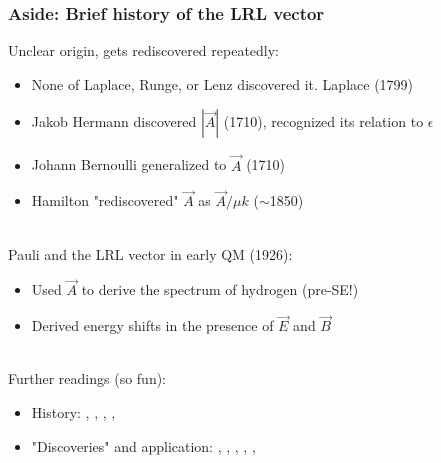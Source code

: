\documentclass{beamer}
\theoremstyle{definition}
\begin{document}
\begin{frame}
\frametitle{Aside: Brief history of the LRL vector}


\pause

Unclear origin, gets rediscovered repeatedly:\pause
\begin{itemize}
	\item None of Laplace, Runge, or Lenz discovered it. Laplace (1799) \pause
	\item Jakob Hermann discovered $|\vec{A}|$ (1710), recognized its relation to $\epsilon$ \pause
	\item  Johann Bernoulli generalized to $\vec{A}$ (1710) \pause
	\item Hamilton "rediscovered" $\vec{A}$ as $\vec{A}/\mu k$ ($\sim$1850) \pause
\end{itemize}
\,\,\, \\ 
Pauli and the LRL vector in early QM (1926): \pause
\begin{itemize}
	\item Used $\vec{A}$ to derive the spectrum of hydrogen (pre-SE!) \pause
	
	\item Derived energy shifts in the presence of $\vec{E}$ and $\vec{B}$ \pause
\end{itemize}

\pause

\,\,\, \\
Further readings (so fun):  

\begin{itemize}
\item History: \cite{valent2003hydrogen}, 
\cite{stahlhofen2004pauli},
\cite{goldstein1975prehistory},
\cite{goldstein1976more},
\cite{goldstein2002classical}


\item "Discoveries"  and application: 
\cite{runge1919vektoranalysis},
\cite{laplace1823traite},
\cite{lenz1924bewegungsverlauf},
\cite{hamilton1847application},
\cite{hermann1710unknown},
\cite{pauli1926wasserstoffspektrum}
\end{itemize}

\end{frame}
\end{document}
